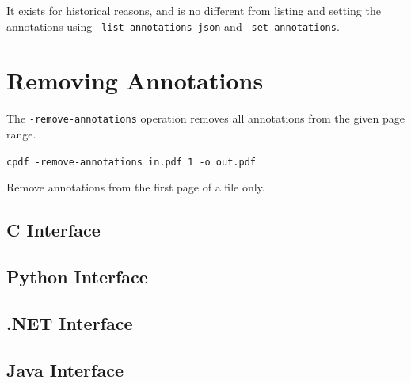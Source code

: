 \documentclass{book}
\begin{document}
\noindent It exists for historical reasons, and is no different from listing and setting the annotations using \texttt{-list-annotations-json} and \texttt{-set-annotations}. 

  \section{Removing Annotations}
  The \texttt{-remove-annotations} operation removes all annotations from the
given page range.

  \begin{framed}
    \noindent\small\verb!cpdf -remove-annotations in.pdf 1 -o out.pdf!
    
    \vspace{2.5mm}
    \noindent Remove annotations from the first page of a file only.
  \end{framed}

\begin{cpdflib}
\clearpage
\section*{C Interface}
\begin{small}\tt

\end{small}
\end{cpdflib}

\begin{pycpdflib}
\clearpage
\section*{Python Interface}
\begin{small}\tt

\end{small}
\end{pycpdflib}

\begin{dotnetcpdflib}
\clearpage
\section*{.NET Interface}
\begin{small}\tt

\end{small}
\end{dotnetcpdflib}

\begin{jcpdflib}
\clearpage
\section*{Java Interface}
\begin{small}\tt

\end{small}
\end{jcpdflib}
\end{document}
